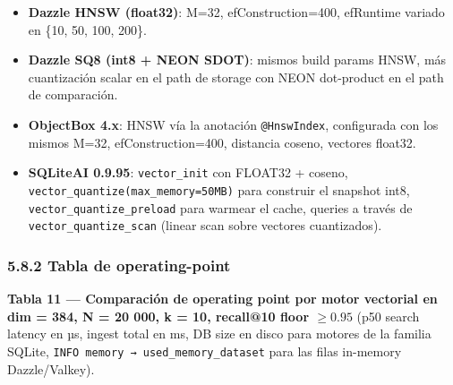 \begin{itemize}
\tightlist
\item
  \textbf{Dazzle HNSW (float32)}: M=32, efConstruction=400, efRuntime variado en
  \{10, 50, 100, 200\}.
\item
  \textbf{Dazzle SQ8 (int8 + NEON SDOT)}: mismos build params HNSW, más
  cuantización scalar en el path de storage con NEON dot-product en el path de
  comparación.
\item
  \textbf{ObjectBox 4.x}: HNSW vía la anotación \texttt{@HnswIndex}, configurada
  con los mismos M=32, efConstruction=400, distancia coseno, vectores float32.
\item
  \textbf{SQLiteAI 0.9.95}: \texttt{vector\_init} con FLOAT32 + coseno,
  \texttt{vector\_quantize(max\_memory=50MB)} para construir el snapshot int8,
  \texttt{vector\_quantize\_preload} para warmear el cache, queries a través de
  \texttt{vector\_quantize\_scan} (linear scan sobre vectores cuantizados).
\end{itemize}

\subsubsection{5.8.2 Tabla de operating-point}\label{tabla-de-operating-point}

\textbf{Tabla 11 --- Comparación de operating point por motor vectorial en dim =
384, N = 20 000, k = 10, recall@10 floor \(\geq 0.95\)} (p50 search latency en
µs, ingest total en ms, DB size en disco para motores de la familia SQLite,
\texttt{INFO\ memory\ →\ used\_memory\_dataset} para las filas in-memory
Dazzle/Valkey).

